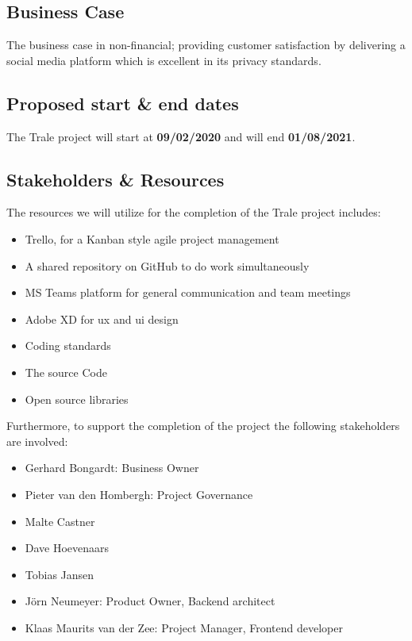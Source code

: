 \subsection{Business Case}\label{subsec:business-case}

The business case in non-financial;
providing customer satisfaction by delivering a social media platform which is excellent in its privacy standards.

\subsection{Proposed start \& end dates}\label{subsec:proposed-start-and-end-dates}

The Trale project will start at \textbf{09/02/2020} and will end \textbf{01/08/2021}.

\subsection{Stakeholders \& Resources}\label{subsec:stakeholders-and-resources}

The resources we will utilize for the completion of the Trale project includes:
\begin{itemize}
    \setlength\itemsep{-0.5em}
    \item Trello, for a Kanban style agile project management
    \item A shared repository on GitHub to do work simultaneously
    \item MS Teams platform for general communication and team meetings
    \item Adobe XD for \ac{ux} and \ac{ui} design
    \item Coding standards
    \item The source Code
    \item Open source libraries
\end{itemize}

Furthermore, to support the completion of the project the following stakeholders are involved:
\begin{itemize}
    \setlength\itemsep{-0.5em}
    \item Gerhard Bongardt: Business Owner
    \item Pieter van den Hombergh: Project Governance
    \item Malte Castner
    \item Dave Hoevenaars
    \item Tobias Jansen
    \item J\"orn Neumeyer: Product Owner, Backend architect
    \item Klaas Maurits van der Zee: Project Manager, Frontend developer
\end{itemize}

